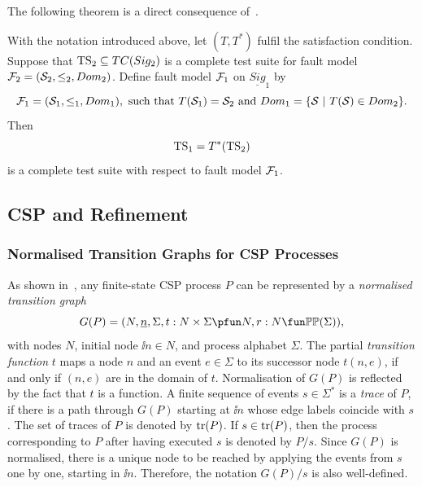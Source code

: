  


 The following theorem is a direct consequence of~\cite[Theorem~2.1]{Huang2017}.

\begin{theorem}\label{th:theorytranslation}
With the notation introduced above, let  $(T,T^*)$ fulfil the satisfaction condition.
Suppose that ${\text{TS}}_2 \subseteq TC(Sig_2)$ is a complete test suite
for fault model ${\cal F}_2 = ({\cal S}_2,\le_2,Dom_2)$. Define fault model ${\cal F}_1$ on 
$\underline{Sig}_1$ by
$$
{\cal F}_1 = ({\cal S}_1,\le_1,Dom_1),\ \text{such that}\
T({\cal S}_1)  =  {\cal S}_2\ \text{and}\
Dom_1  =  \{ {\cal S}~|~T({\cal S})\in Dom_2 \}.
$$
Then
$$
{\text{TS}}_1 = T^*({\text{TS}}_2)
$$
is a complete test suite with respect to fault model ${\cal F}_1$.
\xbox
\end{theorem}

 
 


\subsection{CSP and Refinement}

\subsubsection*{Normalised Transition Graphs for CSP Processes}
\label{sec:ntg}

As shown in~\cite{Roscoe:1994:CME:197600}, any finite-state CSP process $P$ can be represented by a \emph{normalised transition graph} 
$$
G(P) = ( N, \ii n, \Sigma, t : N\times\Sigma \pfun N, r : N \fun \mathbb{P}\mathbb{P}(\Sigma)),
$$
with nodes $N$, initial node $\ii n\in N$, and process alphabet $\Sigma$. The partial \emph{transition function} $t$ maps a node $n$ and an event $e\in\Sigma$ to its successor node $t(n,e)$, if and only if $(n,e)$ are in the domain of $t$. Normalisation of $G(P)$ is reflected 
by the fact that $t$ is a function. A finite sequence of events $s\in\Sigma^*$ 
is a \emph{trace} of $P$, if there is a path through $G(P)$ starting  at $\ii n$ whose edge labels coincide 
with $s$. The set of traces of $P$ is denoted by $\text{tr}(P)$. If $s\in\text{tr}(P)$, then the process corresponding to $P$ after having executed $s$ is denoted by $P/s$. Since
$G(P)$ is normalised, there is a unique node to be  reached by applying the events from
$s$ one by one, starting in $\ii n$. Therefore, the notation $G(P)/s$  is also well-defined.


